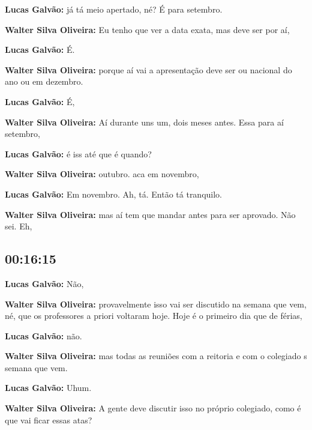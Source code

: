 \textbf{Lucas Galvão:} já tá meio apertado, né? É para setembro.



\textbf{Walter Silva Oliveira:} Eu tenho que ver a data exata, mas deve ser por aí,



\textbf{Lucas Galvão:} É.



\textbf{Walter Silva Oliveira:} porque aí vai a apresentação deve ser ou nacional do ano ou em dezembro.



\textbf{Lucas Galvão:} É,



\textbf{Walter Silva Oliveira:} Aí durante uns um, dois meses antes. Essa para aí setembro,



\textbf{Lucas Galvão:} é iss até que é quando?



\textbf{Walter Silva Oliveira:} outubro. aca em novembro,



\textbf{Lucas Galvão:} Em novembro. Ah, tá. Então tá tranquilo.



\textbf{Walter Silva Oliveira:} mas aí tem que mandar antes para ser aprovado. Não sei. Eh,



\subsection{\textbf{00:16:15}}



\textbf{Lucas Galvão:} Não,



\textbf{Walter Silva Oliveira:} provavelmente isso vai ser discutido na semana que vem, né, que os professores a priori voltaram hoje. Hoje é o primeiro dia que de férias,



\textbf{Lucas Galvão:} não.



\textbf{Walter Silva Oliveira:} mas todas as reuniões com a reitoria e com o colegiado s semana que vem.



\textbf{Lucas Galvão:} Uhum.



\textbf{Walter Silva Oliveira:} A gente deve discutir isso no próprio colegiado, como é que vai ficar essas atas?



